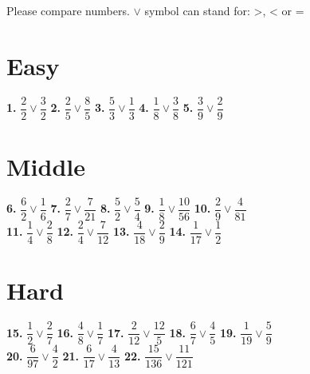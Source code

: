 \documentclass[a4paper]{article}
\begin{document}
{\large Please compare numbers. $\vee$ symbol can stand for: >, < or =}	
		
\section* {\Large Easy}
		
\Large {
\textbf{1.} $\dfrac{2}{2}\vee\dfrac{3}{2}$ \hspace{0.25cm}
\textbf{2.} $\dfrac{2}{5}\vee\dfrac{8}{5}$ \hspace{0.25cm}
\textbf{3.} $\dfrac{5}{3}\vee\dfrac{1}{3}$ \hspace{0.5cm}
\textbf{4.} $\dfrac{1}{8}\vee\dfrac{3}{8}$ \hspace{0.25cm}
\textbf{5.} $\dfrac{3}{9}\vee\dfrac{2}{9}$
}
		
\section* {\Large Middle}
		
\Large {
\textbf{6.} $\dfrac{6}{2}\vee\dfrac{1}{6}$ \hspace{0.25cm}
\textbf{7.} $\dfrac{2}{7}\vee\dfrac{7}{21}$ \hspace{0.25cm}
\textbf{8.} $\dfrac{5}{2}\vee\dfrac{5}{4}$ \hspace{0.25cm}
\textbf{9.} $\dfrac{1}{8}\vee\dfrac{10}{56}$ \hspace{0.25cm}
\textbf{10.} $\dfrac{2}{9}\vee\dfrac{4}{81}$ \\ [0.25cm]
\textbf{11.} $\dfrac{1}{4}\vee\dfrac{2}{8}$ \hspace{0.25cm}
\textbf{12.} $\dfrac{2}{4}\vee\dfrac{7}{12}$ \hspace{0.25cm}
\textbf{13.} $\dfrac{4}{18}\vee\dfrac{2}{9}$ \hspace{0.25cm}
\textbf{14.} $\dfrac{1}{17}\vee\dfrac{1}{2}$
}
		
\section* {\Large Hard}

\Large {
\textbf{15.} $\dfrac{1}{2}\vee\dfrac{2}{7}$ \hspace{0.25cm}
\textbf{16.} $\dfrac{4}{8}\vee\dfrac{1}{7}$ \hspace{0.25cm}
\textbf{17.} $\dfrac{2}{12}\vee\dfrac{12}{5}$ \hspace{0.25cm}
\textbf{18.} $\dfrac{6}{7}\vee\dfrac{4}{5}$  \hspace{0.25cm}
\textbf{19.} $\dfrac{1}{19}\vee\dfrac{5}{9}$ \\[0.25cm]
\textbf{20.} $\dfrac{6}{97}\vee\dfrac{4}{2}$ \hspace{0.25cm}
\textbf{21.} $\dfrac{6}{17}\vee\dfrac{4}{13}$ \hspace{0.25cm}
\textbf{22.} $\dfrac{15}{136}\vee\dfrac{11}{121}$
}
\end{document}
